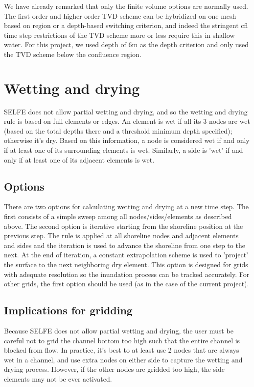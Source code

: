 We have already remarked that only the finite volume options are normally used. The first order and higher order TVD scheme can be hybridized on one mesh based on region or a depth-based switching criterion, and indeed the stringent \gls{cfl} time step restrictions of the TVD scheme more or less require this in shallow water. For this project, we used depth of 6m as the depth criterion and only used the TVD scheme below the confluence region.

\section{Wetting and drying}
 SELFE does not allow partial wetting and drying, and so the wetting and drying rule 
is based on full elements or edges. An element is wet if all
its 3 nodes are wet (based on the total depths there and a threshold minimum 
depth specified); otherwise it's dry. Based on this
information, a node is considered wet if and only if at least one of its surrounding
 elements is wet. Similarly, a side is 'wet'  if and only if at least 
one of its adjacent elements is wet. 

\subsection{Options}
There are two options for calculating wetting and drying at a new time step. The first consists of a simple sweep among all
nodes/sides/elements as described above. The second option is iterative starting from the shoreline position at the previous step.
The rule is applied at all shoreline nodes and adjacent elements and sides and the iteration is used to advance the shoreline from
one step to the next. At the end of iteration, a constant extrapolation scheme is used to 'project' the surface to the next
neighboring dry element. This option is designed for grids with adequate resolution so the inundation process can be tracked
accurately. For other grids, the first option should be used (as in the case of the current project).
\subsection{Implications for gridding}
\label{subsec-wet-dry-grid}
Because SELFE does not allow partial wetting and drying, the user must be careful not to grid the channel bottom too high such that
the entire channel is blocked from flow. In practice, it's best to at least use 2 nodes that are always wet in a channel, and use
extra nodes on either side to capture the wetting and drying process. However, if the other nodes are gridded too high, the side
elements may not be ever activated.

